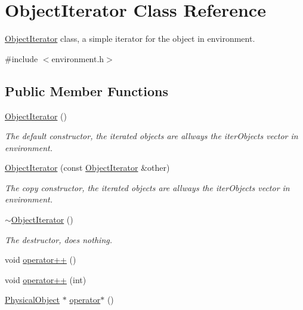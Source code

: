 \hypertarget{classObjectIterator}{\section{Object\-Iterator Class Reference}
\label{classObjectIterator}
}


\hyperlink{classObjectIterator}{Object\-Iterator} class, a simple iterator for the object in environment.  




{\ttfamily \#include $<$environment.\-h$>$}

\subsection*{Public Member Functions}
\begin{DoxyCompactItemize}
\item 
\hyperlink{classObjectIterator_a063765a03cce97a12c59787a1cda5121}{Object\-Iterator} ()
\begin{DoxyCompactList}\small\item\em The default constructor, the iterated objects are allways the iter\-Objects vector in environment. \end{DoxyCompactList}\item 
\hyperlink{classObjectIterator_acf20f72fa4c98e62b4a8dde10350df9f}{Object\-Iterator} (const \hyperlink{classObjectIterator}{Object\-Iterator} \&other)
\begin{DoxyCompactList}\small\item\em The copy constructor, the iterated objects are allways the iter\-Objects vector in environment. \end{DoxyCompactList}\item 
\hyperlink{classObjectIterator_a69e552a361c315f532bec9ee0bfe15a5}{$\sim$\-Object\-Iterator} ()
\begin{DoxyCompactList}\small\item\em The destructor, does nothing. \end{DoxyCompactList}\item 
void \hyperlink{classObjectIterator_aa693c5c3e5c105c6bcea5efe92ffdb22}{operator++} ()
\item 
void \hyperlink{classObjectIterator_a819be81f90fae313d20f83ee90c1057b}{operator++} (int)
\item 
\hyperlink{classPhysicalObject}{Physical\-Object} $\ast$ \hyperlink{classObjectIterator_aab94d8abe38edb14c18123a048dcd3d7}{operator$\ast$} ()
\item 

\end{DoxyCompactItemize}
